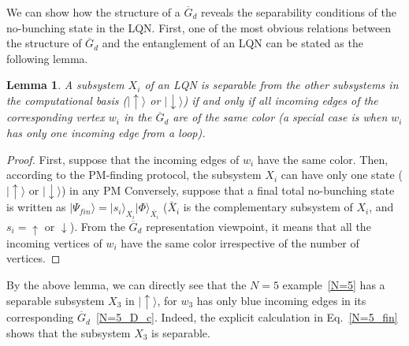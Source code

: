 \documentclass[a4paper,twocolumn,8pt,accepted=2021-12-15]{quantumarticle}
\newtheorem{lemma}{Lemma}
\def\P{\Psi}
\def\>{\rangle}
\def\dc{{\overline{G}_d }}
\begin{document}
	
	We can show how the structure of a $\dc$ reveals the separability conditions of the no-bunching state in the LQN. First, one of the most obvious relations between the structure of $\dc$ and the entanglement of an LQN can be stated as the following lemma. 
	\begin{lemma}\label{separability}
		A subsystem $X_i$ of an LQN is separable from the other subsystems in the computational basis ($|\uparrow \> $ or  $|\downarrow \>$) if and only if all  incoming edges of the corresponding vertex $w_i$ in the $\dc$ are of the same color (a special case is when $w_i$ has only one incoming edge from a loop). 
	\end{lemma}
	\begin{proof}
		First, suppose that the incoming edges of $w_i$ have the same color. Then, according to the PM-finding protocol, the subsystem $X_i$ can have only one state ($|\uparrow\>$ or $|\downarrow\>$) in any PM
		Conversely, suppose that a final total no-bunching state is written as $|\P_{fin}\> = |s_{i}\>_{X_i} | \Phi\>_{\bar{X_i}}$ ($\bar{X}_i$ is the complementary subsystem of $X_i$, and $s_i=\uparrow$ or $\downarrow$). From the $\dc$ representation viewpoint, it means that all  the incoming vertices of $w_i$ have the same color irrespective of the number of vertices. 
	\end{proof}
	By the above lemma, we can directly see that the $N=5$ example~\eqref{N=5} has a separable subsystem $X_3$ in $|\uparrow\>$, for $w_3$ has only blue incoming edges in its corresponding $\dc$~\eqref{N=5_D_c}. Indeed, the explicit calculation in Eq.~\eqref{N=5_fin} shows that the subsystem $X_3$ is separable. 	
	
\end{document}
